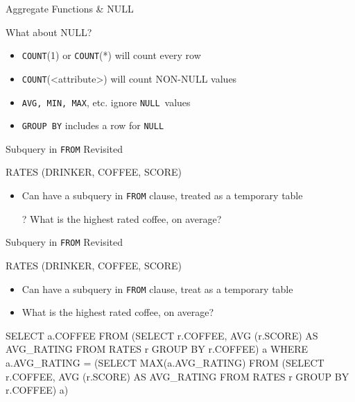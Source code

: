 \documentclass[aspectratio=169]{beamer}
\newcommand{\NULL}{\texttt{NULL}}
\begin{document}
%
%

\begin{frame}{Aggregate Functions  \& NULL}

What about NULL?


\begin{itemize}
\item \texttt{COUNT}(1) or \texttt{COUNT}(*) will count every row
\item \texttt{COUNT}(<attribute>) will count NON-NULL values
\item \texttt{AVG, MIN, MAX}, etc. ignore \NULL\ values
\item \texttt{GROUP BY} includes a row for \NULL
\end{itemize}
\end{frame}



\begin{frame}{Subquery in \texttt{FROM} Revisited}

RATES (DRINKER, COFFEE, SCORE)

\begin{itemize}
\item Can have a subquery in \texttt{FROM} clause, treated as a temporary table
\item[?] What is the highest rated coffee, on average?
\end{itemize}
\end{frame}

\begin{frame}[fragile]{Subquery in \texttt{FROM} Revisited}

RATES (DRINKER, COFFEE, SCORE)

\begin{itemize}
\item Can have a subquery in \texttt{FROM} clause, treat as a temporary table
\item What is the highest rated coffee, on average?
\end{itemize}

\begin{SQL}
SELECT a.COFFEE
FROM (SELECT r.COFFEE, AVG (r.SCORE) AS AVG_RATING
      FROM RATES r
      GROUP BY r.COFFEE) a
WHERE a.AVG_RATING = (SELECT MAX(a.AVG_RATING)
                      FROM (SELECT r.COFFEE, AVG (r.SCORE) 
                               AS AVG_RATING
                            FROM RATES r
                            GROUP BY r.COFFEE) a)
\end{SQL}
\end{frame}
\end{document}
